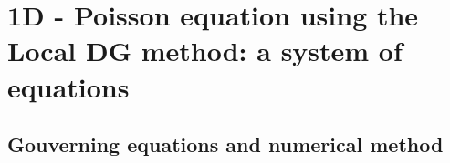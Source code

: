\section{1D - Poisson equation using the Local DG method: a system of equations}

\subsection{Gouverning equations and numerical method}